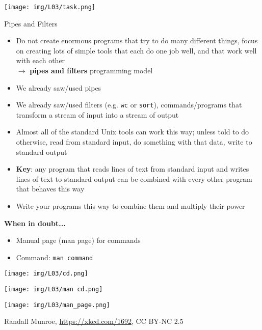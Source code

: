 \documentclass[hyperref={pdfpagelabels=false},aspectratio=169]{beamer}
\begin{document}
\begin{frame}

    \texttt{[image: img/L03/task.png]}
\end{frame}


\begin{frame}{Pipes and Filters}
    
    \begin{itemize}
        \item Do not create enormous programs that try to do many different things, focus on creating lots of simple tools that each do one job well, and that work well with each other \\$\rightarrow$ \textbf{pipes and filters} programming model
        \item We already saw/used pipes
        \item We already saw/used filters (e.g. \texttt{wc} or \texttt{sort}), commands/programs that transform a stream of input into a stream of output
        \item Almost all of the standard Unix tools can work this way; unless told to do otherwise, read from standard input, do something with that data, write to standard output
        \item \textbf{Key}: any program that reads lines of text from standard input and writes lines of text to standard output can be combined with every other program that behaves this way
        \item Write your programs this way to combine them and multiply their power
    \end{itemize}
    
\end{frame}

\begin{frame}
    \begin{minipage}{0.70\textwidth}
    
    \textbf{When in doubt...}
    \begin{itemize}
        \item Manual page (man page) for commands
        \item Command: \texttt{man command}
    \end{itemize}
    
    \texttt{[image: img/L03/cd.png]}
    
    \vspace{10pt}
    \texttt{[image: img/L03/man cd.png]}
    
\end{minipage}
\begin{minipage}{0.29\textwidth}
\centering
\texttt{[image: img/L03/man\_page.png]}
\tiny 
    
    Randall Munroe, \url{https://xkcd.com/1692}, CC BY-NC 2.5
\end{minipage}
\end{frame}
\end{document}
